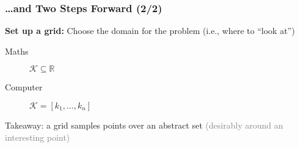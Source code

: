 \documentclass[10pt, aspectratio=1610, handout]{beamer}
\newcommand{\gotobutton}[2]{\hyperlink{#1}{\beamergotobutton{#2}}}
\begin{document}
  \begin{frame}
    \frametitle{\dots and Two Steps Forward (2/2)}  \label{sld:grid}

    \textbf{Set up a grid:} Choose the domain for the problem (i.e., where to ``look at'')

    \vfill\pause

    \begin{description}
      \item[Maths] $\mathcal{K} \subseteq \mathbb{R}$
      \item[Computer] $\mathcal{K} = [k_1, \ldots, k_n]$
    \end{description}

    \vfill\pause

    \begin{figure}
      \centering
    \end{figure}

    \vfill\pause

    Takeaway: a grid samples points over an abstract set \hfill \textcolor{gray}{(desirably around an interesting point)}

    \vfill

    \hfill \gotobutton{apx:grid_example}{Example}

  \end{frame}
\end{document}
